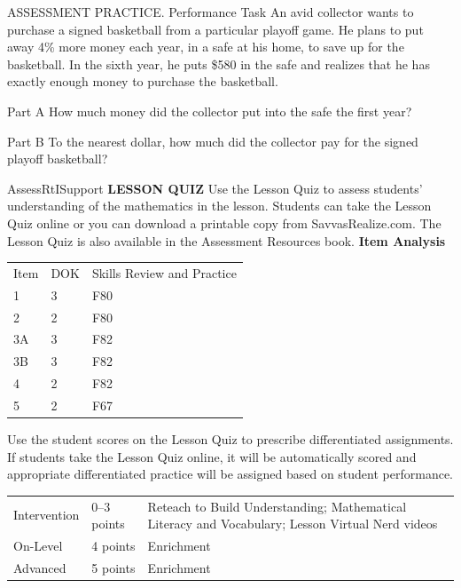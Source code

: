 \documentclass{article}
\newenvironment{practice}[2]{}{}        %
\newenvironment{te-addendum}[2]{}{}     %
\newcommand{\answer}[1]{}               %
\newcommand{\placeholder}[2]{}          %
\begin{document}
\begin{practice}{43}{3}
ASSESSMENT PRACTICE. Performance Task An avid collector wants to purchase a signed basketball from a particular playoff game. He plans to put away 4\% more money each year, in a safe at his home, to save up for the basketball. In the sixth year, he puts \$580 in the safe and realizes that he has exactly enough money to purchase the basketball.
\placeholder{illustration}{Signed brown basketball in a clear display cube. Callout: Price = Year 5 savings + \$580.00.}
Part A How much money did the collector put into the safe the first year?
\answer{\$476.72}
Part B To the nearest dollar, how much did the collector pay for the signed playoff basketball?
\answer{\$3,162.00}
\end{practice}
\begin{te-addendum}{Assess}{RtISupport}
\textbf{LESSON QUIZ}
Use the Lesson Quiz to assess students' understanding of the mathematics in the lesson.
Students can take the Lesson Quiz online or you can download a printable copy from SavvasRealize.com. The Lesson Quiz is also available in the Assessment Resources book.
\textbf{Item Analysis}
\begin{tabular}{lll}
Item & DOK & Skills Review and Practice \\
1 & 3 & F80 \\
2 & 2 & F80 \\
3A & 3 & F82 \\
3B & 3 & F82 \\
4 & 2 & F82 \\
5 & 2 & F67 \\
\end{tabular}
Use the student scores on the Lesson Quiz to prescribe differentiated assignments.
If students take the Lesson Quiz online, it will be automatically scored and appropriate differentiated practice will be assigned based on student performance.
\begin{tabular}{lll}
Intervention & 0--3 points & Reteach to Build Understanding; Mathematical Literacy and Vocabulary; Lesson Virtual Nerd videos \\
On-Level & 4 points & Enrichment \\
Advanced & 5 points & Enrichment \\
\end{tabular}
\end{te-addendum}
\end{document}
